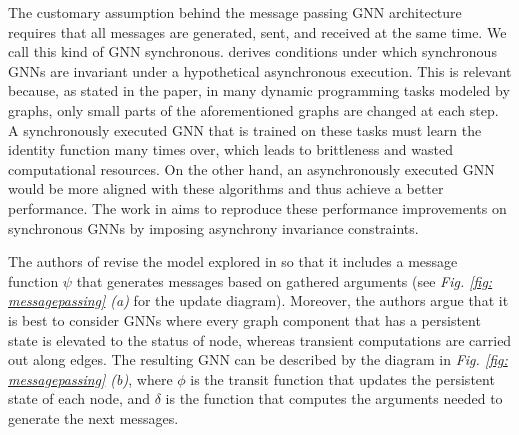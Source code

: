 \documentclass[11pt,a4paper,openright,twoside]{report}
\theoremstyle{plain}
\theoremstyle{definition}
\begin{document}
The customary assumption behind the message passing GNN architecture requires that all messages are generated, sent, and received at the same time. We call this kind of GNN synchronous. \cite{dudzik2024asynchronous} derives conditions under which synchronous GNNs are invariant under a hypothetical asynchronous execution. This is relevant because, as stated in the paper, in many dynamic programming tasks modeled by graphs, only small parts of the aforementioned graphs are changed at each step. A synchronously executed GNN that is trained on these tasks must learn the identity function many times over, which leads to brittleness and wasted computational resources. On the other hand, an asynchronously executed GNN would be more aligned with these algorithms and thus achieve a better performance. The work in \cite{dudzik2024asynchronous} aims to reproduce these performance improvements on synchronous GNNs by imposing asynchrony invariance constraints. 

The authors of \cite{dudzik2024asynchronous} revise the model explored in \cite{dudzik2022graph} so that it includes a message function $\psi$ that generates messages based on gathered arguments (see \textit{Fig. \ref{fig: messagepassing} (a)} for the update diagram). Moreover, the authors argue that it is best to consider GNNs where every graph component that has a persistent state is elevated to the status of node, whereas transient computations are carried out along edges. The resulting GNN can be described by the diagram in \textit{Fig. \ref{fig: messagepassing} (b)}, where $\phi$ is the transit function that updates the persistent state of each node, and $\delta$ is the function that computes the arguments needed to generate the next messages.
\end{document}

